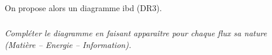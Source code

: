 \documentclass[11pt,oneside]{article}
\begin{document}


On propose alors un diagramme ibd  (DR3).

\subparagraph{}
\textit{Compléter le diagramme en faisant apparaître pour chaque flux sa nature (Matière – Energie – Information).}

\end{document}
